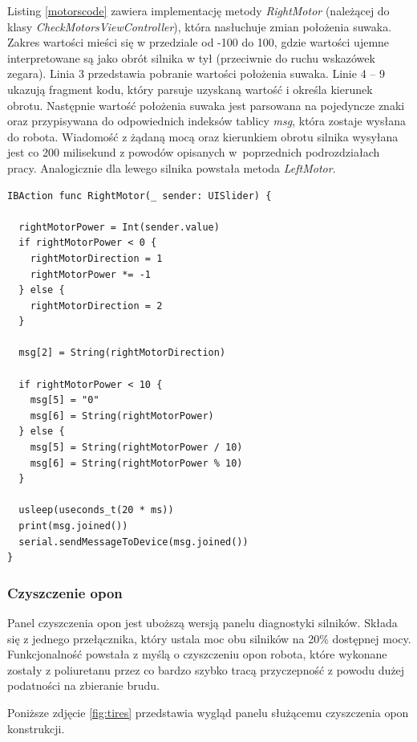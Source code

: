 Listing \ref{motorscode} zawiera implementację metody \textit{RightMotor} (należącej do klasy \textit{CheckMotorsViewController}), która nasłuchuje zmian położenia suwaka. Zakres wartości mieści się w przedziale od -100 do 100, gdzie wartości ujemne interpretowane są jako obrót silnika w tył (przeciwnie do ruchu wskazówek zegara). Linia 3 przedstawia pobranie wartości położenia suwaka. Linie 4 – 9 ukazują fragment kodu, który parsuje uzyskaną wartość i określa kierunek obrotu. Następnie wartość położenia suwaka jest parsowana na pojedyncze znaki oraz przypisywana do odpowiednich indeksów tablicy \textit{msg}, która zostaje wysłana do robota. Wiadomość z żądaną mocą oraz kierunkiem obrotu silnika wysyłana jest co 200 milisekund z powodów opisanych w~poprzednich podrozdziałach pracy. Analogicznie dla lewego silnika powstała metoda \textit{LeftMotor}.

\begin{minipage}{\textwidth}
	\begin{lstlisting}[label=motorscode,caption=Nasłuchiwanie zmiany położenia suwaka.]
IBAction func RightMotor(_ sender: UISlider) {
  
  rightMotorPower = Int(sender.value)
  if rightMotorPower < 0 {
    rightMotorDirection = 1
    rightMotorPower *= -1
  } else {
    rightMotorDirection = 2
  }
    
  msg[2] = String(rightMotorDirection)
    
  if rightMotorPower < 10 {
    msg[5] = "0"
    msg[6] = String(rightMotorPower)
  } else {
    msg[5] = String(rightMotorPower / 10)
    msg[6] = String(rightMotorPower % 10)
  }
    
  usleep(useconds_t(20 * ms))
  print(msg.joined())
  serial.sendMessageToDevice(msg.joined())
}
	\end{lstlisting}
\end{minipage}

\subsubsection{Czyszczenie opon}
Panel czyszczenia opon jest uboższą wersją panelu diagnostyki silników. Składa się z jednego przełącznika, który ustala moc obu silników na 20\% dostępnej mocy. Funkcjonalność powstała z myślą o czyszczeniu opon robota, które wykonane zostały z poliuretanu przez co bardzo szybko tracą przyczepność z powodu dużej podatności na zbieranie brudu.

\newpage

Poniższe zdjęcie \ref{fig:tires} przedstawia wygląd panelu służącemu czyszczenia opon konstrukcji.

